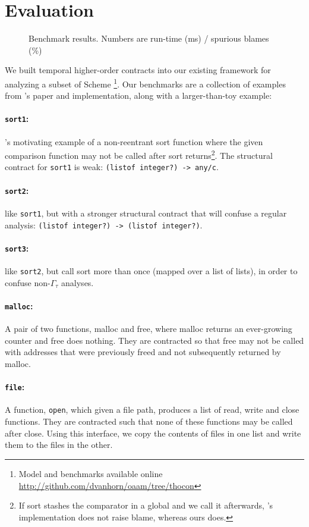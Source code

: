 \section{Evaluation}

\begin{figure}
  
  \caption{Benchmark results. Numbers are run-time (ms) / spurious blames (\%)}
  \label{fig:evaluation}
\end{figure}
We built temporal higher-order contracts into our existing framework for analyzing a subset of Scheme \footnote{Model and benchmarks available online \url{http://github.com/dvanhorn/oaam/tree/thocon}}.
%
Our benchmarks are a collection of examples from \dfm's paper and implementation, along with a larger-than-toy example:
\paragraph{{\tt sort1}:}{\dfm's motivating example of a non-reentrant sort function where the given comparison function may not be called after sort returns\footnote{If sort stashes the comparator in a global and we call it afterwards, \dfm's implementation does not raise blame, whereas ours does.}.
%
The structural contract for {\tt sort1} is weak: {\tt (listof integer?) -> any/c}.
}
\paragraph{{\tt sort2}:}{like {\tt sort1}, but with a stronger structural contract that will confuse a regular analysis: {\tt (listof integer?) -> (listof integer?)}.}
\paragraph{{\tt sort3}:}{like {\tt sort2}, but call sort more than once (mapped over a list of lists), in order to confuse non-$\Gamma_\tau$ analyses.}
\paragraph{{\tt malloc}:}{A pair of two functions, malloc and free, where malloc returns an ever-growing counter and free does nothing. They are contracted so that free may not be called with addresses that were previously freed and not subsequently returned by malloc.}
\paragraph{{\tt file}:}{A function, {\tt open}, which given a file path, produces a list of read, write and close functions. They are contracted such that none of these functions may be called after close. Using this interface, we copy the contents of files in one list and write them to the files in the other.}
